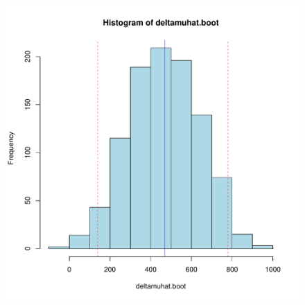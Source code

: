\documentclass[10pt]{beamer}\usepackage[]{graphicx}\usepackage[]{color}
\makeatletter
\def\maxwidth{ %
  \ifdim\Gin@nat@width>\linewidth
    \linewidth
  \else
    \Gin@nat@width
  \fi
}
\newenvironment{knitrout}{}{} %
\makeatother
\begin{document}
\begin{frame}
\begin{figure}
\begin{minipage}[h]{0.45\linewidth}
\begin{knitrout}
{\centering \includegraphics[width=\maxwidth]{figure/unnamed-chunk-9-1} 

}


\end{knitrout}
		\end{minipage}
	\end{figure}
	
	
\end{frame}
\end{document}
